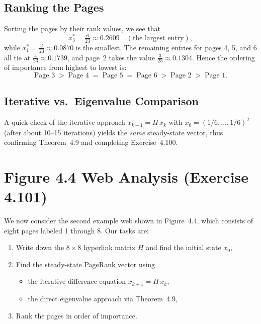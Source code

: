 \documentclass{article}
\begin{document}
\subsection*{Ranking the Pages}
Sorting the pages by their rank values, we see that 
\[
x^*_3 = \tfrac{6}{23} \approx 0.2609 
\quad
(\text{the largest entry}),
\]
while $x^*_1 = \tfrac{2}{23} \approx 0.0870$ 
is the smallest. The remaining entries for 
pages 4, 5, and 6 all tie at $\tfrac{4}{23} \approx 0.1739$, 
and page~2 takes the value $\tfrac{3}{23} \approx 0.1304$. 
Hence the ordering of importance from highest to lowest is:
\[
\text{Page }3 
\;>\;
\text{Page }4 \;=\; \text{Page }5 \;=\; \text{Page }6
\;>\;
\text{Page }2
\;>\;
\text{Page }1.
\]

\subsection*{Iterative vs.\ Eigenvalue Comparison}
A quick check of the iterative approach 
$x_{k+1} = H \, x_k$ with $x_0 = (1/6, \ldots, 1/6)^T$ 
(after about 10--15 iterations) yields the 
\emph{same} steady-state vector, thus confirming 
Theorem~4.9 and completing Exercise~4.100.



\section{Figure 4.4 Web Analysis (Exercise 4.101)}

We now consider the second example web shown in Figure~4.4, which consists of 
eight pages labeled 1 through 8. Our tasks are:

\begin{enumerate}
  \item Write down the $8\times 8$ hyperlink matrix $H$ and find the initial state $x_0$,
  \item Find the steady-state PageRank vector using 
    \begin{itemize}
      \item the iterative difference equation $x_{k+1} = H\,x_k$, 
      \item the direct eigenvalue approach via Theorem~4.9,
    \end{itemize}
  \item Rank the pages in order of importance.
\end{enumerate}
\end{document}
